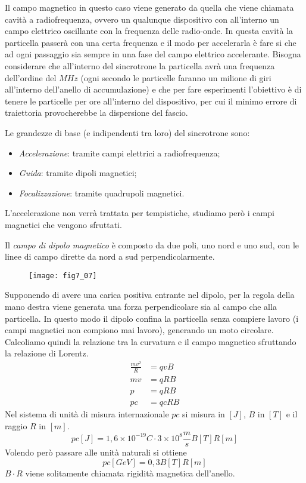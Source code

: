 Il campo magnetico in questo caso viene generato da quella che viene chiamata cavità a radiofrequenza, ovvero un qualunque dispositivo con all'interno un campo elettrico oscillante con la frequenza delle radio-onde.
In questa cavità la particella passerà con una certa frequenza e il modo per accelerarla è fare si che ad ogni passaggio sia sempre in una fase del campo elettrico accelerante.
Bisogna considerare che all'interno del sincrotrone la particella avrà una frequenza dell'ordine del $MHz$ (ogni secondo le particelle faranno un milione di giri all'interno dell'anello di accumulazione) e che per fare esperimenti l'obiettivo è di tenere le particelle per ore all'interno del dispositivo, per cui il minimo errore di traiettoria provocherebbe la dispersione del fascio.
 
Le grandezze di base (e indipendenti tra loro) del sincrotrone sono:
\begin{itemize}
\item \emph{Accelerazione}: tramite campi elettrici a radiofrequenza;

\item \emph{Guida}: tramite dipoli magnetici;

\item\emph{Focalizzazione}: tramite quadrupoli magnetici.
\end{itemize}
L'accelerazione non verrà trattata per tempistiche, studiamo però i campi magnetici che vengono sfruttati.

Il \emph{campo di dipolo magnetico} è composto da due poli, uno nord e uno sud, con le linee di campo dirette da nord a sud perpendicolarmente.
\begin{figure}[h]
\centering
\texttt{[image: fig7\_07]}
\end{figure}

Supponendo di avere una carica positiva entrante nel dipolo, per la regola della mano destra viene generata una forza perpendicolare sia al campo che alla particella.
In questo modo il dipolo confina la particella senza compiere lavoro (i campi magnetici non compiono mai lavoro), generando un moto circolare.
Calcoliamo quindi la relazione tra la curvatura e il campo magnetico sfruttando la relazione di Lorentz.
\begin{equation}
\begin{split}
\frac{mv^2}{R} & =qvB\\
mv & =qRB\\
p & =qRB\\
pc & =qcRB
\end{split}
\end{equation}
Nel sistema di unità di misura internazionale $pc$ si misura in $[J]$, $B$ in $[T]$ e il raggio $R$ in $[m]$.
\begin{equation}
pc[J]=1,6\times10^{-19}C\cdot3\times10^8\frac{m}{s}B[T]R[m]
\end{equation}
Volendo però passare alle unità naturali si ottiene
\begin{equation}
pc [GeV]=0,3 B[T]R[m]
\end{equation}
$B\cdot R$ viene solitamente chiamata rigidità magnetica dell'anello.

